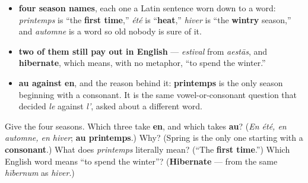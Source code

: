 \begin{grammarlens}[title={What you've built this chapter}]
\begin{itemize}
\raggedright
  \item \textbf{four season names}, each one a Latin sentence worn down to a word: \emph{printemps} is \textquotedblleft{}the \textbf{first time},\textquotedblright{} \emph{été} is \textquotedblleft{}\textbf{heat},\textquotedblright{} \emph{hiver} is \textquotedblleft{}the \textbf{wintry} season,\textquotedblright{} and \emph{automne} is a word so old nobody is sure of it.
  \item \textbf{two of them still pay out in English} — \emph{estival} from \emph{aestās}, and \textbf{hibernate}, which means, with no metaphor, \textquotedblleft{}to spend the winter.\textquotedblright{}
  \item \textbf{au against en}, and the reason behind it: \textbf{printemps} is the only season beginning with a consonant. It is the same vowel-or-consonant question that decided \emph{le} against \emph{l'}, asked about a different word.
\end{itemize}
\end{grammarlens}

\begin{tcolorbox}[breakable,colback=teal!4,colframe=teal!35!black,title={Before you move on}]
Give the four seasons. Which three take \textbf{en}, and which takes \textbf{au}? (\emph{En été, en automne, en hiver}; \textbf{au printemps}.) Why? (Spring is the only one starting with a \textbf{consonant}.) What does \emph{printemps} literally mean? (\textquotedblleft{}The \textbf{first time}.\textquotedblright{}) Which English word means \textquotedblleft{}to spend the winter\textquotedblright{}? (\textbf{Hibernate} — from the same \emph{hībernum} as \emph{hiver}.)
\end{tcolorbox}
